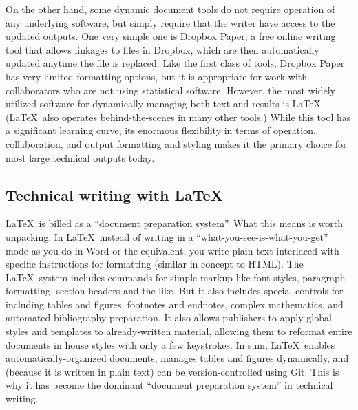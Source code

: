 On the other hand, some dynamic document tools do not require
operation of any underlying software, but simply require
that the writer have access to the updated outputs.
One very simple one is Dropbox Paper, a free online writing tool
that allows linkages to files in Dropbox,
which are then automatically updated anytime the file is replaced.
Like the first class of tools, Dropbox Paper has very limited formatting options,
but it is appropriate for work with collaborators who are not using statistical software.
However, the most widely utilized software
for dynamically managing both text and results is \LaTeX\.
  \index{\LaTeX}
(\LaTeX\ also operates behind-the-scenes in many other tools.)
While this tool has a significant learning curve,
its enormous flexibility in terms of operation, collaboration,
and output formatting and styling
makes it the primary choice for most large technical outputs today.

\subsection{Technical writing with \LaTeX}

\LaTeX\ is billed as a ``document preparation system''.
What this means is worth unpacking.
In \LaTeX\, instead of writing in a ``what-you-see-is-what-you-get'' mode
as you do in Word or the equivalent,
you write plain text interlaced with specific instructions for formatting
(similar in concept to HTML).
The \LaTeX\ system includes commands for simple markup
like font styles, paragraph formatting, section headers and the like.
But it also includes special controls for including tables and figures,
footnotes and endnotes, complex mathematics, and automated bibliography preparation.
It also allows publishers to apply global styles and templates
to already-written material, allowing them to reformat entire documents in house styles
with only a few keystrokes.
In sum, \LaTeX\ enables automatically-organized documents,
manages tables and figures dynamically,
and (because it is written in plain text) can be version-controlled using Git.
This is why it has become the dominant ``document preparation system'' in technical writing.

